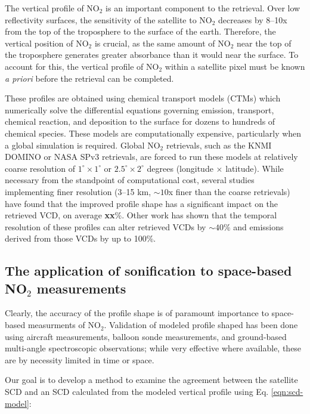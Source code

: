 \documentclass[a4paper,10pt,oneside]{article}
\newcommand{\ce}[1]{$\mathrm{#1}$}
\begin{document}
\begin{sloppy}
The vertical profile of \ce{NO_2} is an important component to the retrieval. Over low reflectivity surfaces, the sensitivity of the satellite to \ce{NO_2} decreases by 8--10x from the top of the troposphere to the surface of the earth.  Therefore, the vertical position of \ce{NO_2} is crucial, as the same amount of \ce{NO_2} near the top of the troposphere generates greater absorbance than it would near the surface. To account for this, the vertical profile of \ce{NO_2} within a satellite pixel must be known \emph{a priori} before the retrieval can be completed.

These profiles are obtained using chemical transport models (CTMs) which numerically solve the differential equations governing emission, transport, chemical reaction, and deposition to the surface for dozens to hundreds of chemical species. These models are computationally expensive, particularly when a global simulation is required. Global \ce{NO_2} retrievals, such as the KNMI DOMINO or NASA SPv3 retrievals, are forced to run these models at relatively coarse resolution of $1^\circ \times 1^\circ$ or $2.5^\circ \times 2^\circ$ degrees (longitude $\times$ latitude).  While necessary from the standpoint of computational cost, several studies implementing finer resolution (3--15 km, $\sim 10$x finer than the coarse retrievals) \cite{vinken14, lin15, mclinden14, russell11, kuhlmann15} have found that the improved profile shape has a significant impact on the retrieved VCD, on average \textbf{xx}\%.  Other work \cite{laughner16} has shown that the temporal resolution of these profiles can alter retrieved VCDs by $\sim 40\%$ and emissions derived from those VCDs by up to 100\%.

\subsection{The application of sonification to space-based NO$_2$ measurements}

Clearly, the accuracy of the profile shape is of paramount importance to space-based measurments of \ce{NO_2}. Validation of modeled profile shaped has been done using aircraft measurements, balloon sonde measurements, and ground-based multi-angle spectroscopic observations; while very effective where available, these are by necessity limited in time or space. 

Our goal is to develop a method to examine the agreement between the satellite SCD and an SCD calculated from the modeled vertical profile using Eq. \eqref{eqn:scd-model}:


\end{sloppy}
\end{document}
